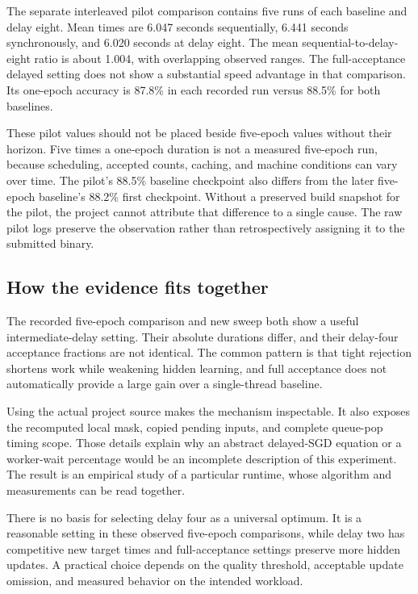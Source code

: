 \documentclass[conference]{IEEEtran}
\begin{document}
The separate interleaved pilot comparison contains five runs of each baseline and delay eight. Mean times are 6.047 seconds sequentially, 6.441 seconds synchronously, and 6.020 seconds at delay eight. The mean sequential-to-delay-eight ratio is about 1.004, with overlapping observed ranges. The full-acceptance delayed setting does not show a substantial speed advantage in that comparison. Its one-epoch accuracy is 87.8\% in each recorded run versus 88.5\% for both baselines.

These pilot values should not be placed beside five-epoch values without their horizon. Five times a one-epoch duration is not a measured five-epoch run, because scheduling, accepted counts, caching, and machine conditions can vary over time. The pilot's 88.5\% baseline checkpoint also differs from the later five-epoch baseline's 88.2\% first checkpoint. Without a preserved build snapshot for the pilot, the project cannot attribute that difference to a single cause. The raw pilot logs preserve the observation rather than retrospectively assigning it to the submitted binary.

\subsection{How the evidence fits together}
The recorded five-epoch comparison and new sweep both show a useful intermediate-delay setting. Their absolute durations differ, and their delay-four acceptance fractions are not identical. The common pattern is that tight rejection shortens work while weakening hidden learning, and full acceptance does not automatically provide a large gain over a single-thread baseline.

Using the actual project source makes the mechanism inspectable. It also exposes the recomputed local mask, copied pending inputs, and complete queue-pop timing scope. Those details explain why an abstract delayed-SGD equation or a worker-wait percentage would be an incomplete description of this experiment. The result is an empirical study of a particular runtime, whose algorithm and measurements can be read together.

There is no basis for selecting delay four as a universal optimum. It is a reasonable setting in these observed five-epoch comparisons, while delay two has competitive new target times and full-acceptance settings preserve more hidden updates. A practical choice depends on the quality threshold, acceptable update omission, and measured behavior on the intended workload.
\end{document}
